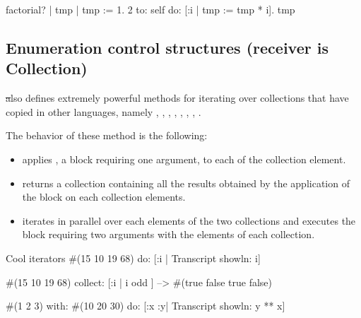 \documentclass[a4paper,10pt,twoside]{book}
\begin{document}
\begin{script}{factorial?}\label{eg:fact}
| tmp |
tmp := 1.
2 to: self do: [:i | tmp := tmp * i].
tmp
\end{script}

\subsection{Enumeration control structures (receiver is Collection)}
\label{sec:loopCollection}
\st also defines extremely powerful methods for iterating over collections that have copied
in other languages, namely  
  
  
, ,
, , ,
, , .

The behavior of these method is the following:
\begin{itemize}
\item {} applies , a block requiring one argument, to each of the collection element.

\item {} returns a collection containing all the results obtained by the application of the block  on each collection elements.

\item {} iterates in parallel over each elements of the two collections and executes the block requiring two arguments with the elements of each collection.
\end{itemize}

\begin{script}{Cool iterators}
#(15 10 19 68) do:
   [:i | Transcript showln: i]

#(15 10 19 68) collect: [:i | i odd ]
   --> #(true false true false)

#(1 2 3) with: #(10 20 30)
   do: [:x :y| Transcript showln: y ** x]
\end{script}
\end{document}
